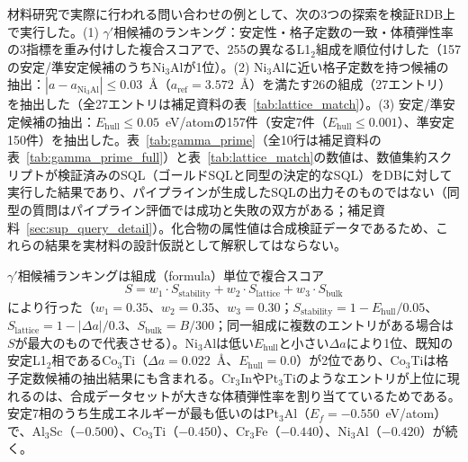 \documentclass[twocolumn]{interact}
\makeatletter
\def\toprule{\noalign{\ifnum0=`}\fi
  \@aboverulesep=\abovetopsep
  \global\@belowrulesep=\belowrulesep
  \global\@thisruleclass=\@ne
  \@ifnextchar[{\@BTrule}{\@BTrule[\heavyrulewidth]}}
\def\midrule{\noalign{\ifnum0=`}\fi
  \@aboverulesep=\aboverulesep
  \global\@belowrulesep=\belowrulesep
  \global\@thisruleclass=\@ne
  \@ifnextchar[{\@BTrule}{\@BTrule[\lightrulewidth]}}
\def\bottomrule{\noalign{\ifnum0=`}\fi
  \@aboverulesep=\aboverulesep
  \global\@belowrulesep=\belowbottomsep
  \global\@thisruleclass=\@ne
  \@ifnextchar[{\@BTrule}{\@BTrule[\heavyrulewidth]}}
\makeatother
\begin{document}
材料研究で実際に行われる問い合わせの例として、次の3つの探索を検証RDB上で実行した。(1) $\gamma'$相候補のランキング：安定性・格子定数の一致・体積弾性率の3指標を重み付けした複合スコアで、255の異なるL1$_2$組成を順位付けした（157の安定/準安定候補のうちNi$_3$Alが1位）。(2) Ni$_3$Alに近い格子定数を持つ候補の抽出：$|a - a_{\text{Ni}_3\text{Al}}| \leq 0.03$~\AA{}{}（$a_{\text{ref}} = 3.572$~\AA{}{}）を満たす26の組成（27エントリ）を抽出した（全27エントリは補足資料の表~\ref{tab:lattice_match}）。(3) 安定/準安定候補の抽出：$E_\text{hull} \leq 0.05$~eV/atomの157件（安定7件（$E_\text{hull} \leq 0.001$）、準安定150件）を抽出した。表~\ref{tab:gamma_prime}（全10行は補足資料の表~\ref{tab:gamma_prime_full}）と表~\ref{tab:lattice_match}の数値は、数値集約スクリプトが検証済みのSQL（ゴールドSQLと同型の決定的なSQL）をDBに対して実行した結果であり、パイプラインが生成したSQLの出力そのものではない（同型の質問はパイプライン評価では成功と失敗の双方がある；補足資料~\ref{sec:sup_query_detail}）。化合物の属性値は合成検証データであるため、これらの結果を実材料の設計仮説として解釈してはならない。

$\gamma'$相候補ランキングは組成（formula）単位で複合スコア
\begin{equation}
  S = w_1 \cdot S_\text{stability} + w_2 \cdot S_\text{lattice} + w_3 \cdot S_\text{bulk}
  \label{eq:composite_score}
\end{equation}
により行った（$w_1 = 0.35$、$w_2 = 0.35$、$w_3 = 0.30$；$S_\text{stability} = 1 - E_\text{hull}/0.05$、$S_\text{lattice} = 1 - |\Delta a|/0.3$、$S_\text{bulk} = B/300$；同一組成に複数のエントリがある場合は$S$が最大のもので代表させる）。Ni$_3$Alは低い$E_\text{hull}$と小さい$\Delta a$により1位、既知の安定L1$_2$相であるCo$_3$Ti（$\Delta a = 0.022$~\AA{}{}、$E_\text{hull} = 0.0$）が2位であり、Co$_3$Tiは格子定数候補の抽出結果にも含まれる。Cr$_3$InやPt$_3$Tiのようなエントリが上位に現れるのは、合成データセットが大きな体積弾性率を割り当てているためである。安定7相のうち生成エネルギーが最も低いのはPt$_3$Al（$E_f = -0.550$~eV/atom）で、Al$_3$Sc（$-0.500$）、Co$_3$Ti（$-0.450$）、Cr$_3$Fe（$-0.440$）、Ni$_3$Al（$-0.420$）が続く。

\begin{table}[t]
  \centering
  \caption{$\gamma'$-相候補ランキングの上位5行（複合スコア$S$；全10行と\texttt{entry\_id}・$a$・$B$は補足資料の表~\ref{tab:gamma_prime_full}）。化合物属性は合成検証データである。}
  \label{tab:gamma_prime}
  \footnotesize
\end{table}
\end{document}

